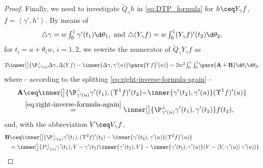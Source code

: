 \begin{proof}
Finally, we need to investigate $ \widetilde{Q}_{\gamma}h $ in \cref{eq:DTP_formula} for $ h\ceq Y_{\gamma}f $, $ f=\left\langle \gamma',h' \right\rangle  $. By means of 
\[\textstyle\triangle\gamma=w\int_{0}^{1}\gamma'(t_1)\d \theta_1, \text{ and }\triangle(Y_\gamma f)=w\int_{0}^{1}(Y_\gamma f)'(t_2)\d \theta_2,\]
for $ t_i=u+\theta_i w,\,i=1,2$, we rewrite the numerator of $ \widetilde{Q}_{\gamma}Y_\gamma f $  as 
\begin{equation}\label{eq:ABsplitting}
\begin{aligned}\textstyle
            2\inner[\big]{ 
                \P^\perp_{\gamma'(u)} \Delta\gamma, \Delta (Y f)
                -
                \inner{ \Delta \gamma,\gamma'(u) } \pars{Y f }'(u) 
            }
            =
            2w^2 \! \int_0^1\int_0^1 
                \!\pars{\mathbf{A} + \mathbf{B}}
            \d \theta_1 \d \theta_2,
\end{aligned}
\end{equation}
where - according to the splitting \cref{eq:right-inverse-formula-again} - 
\begin{equation}\label{eq:splitting-A-part}
\begin{aligned}
    \mathbf{A} 
            &\ceq 
            \inner[\big]{
                 \P^\perp_{\gamma'(u)} \gamma'(t_1)
                 , 
                 (\Upsilon^1f)'(t_2)
                 {-
                 \inner{ \gamma'(t_2),\gamma'(u) } (\Upsilon^1f)'(u)}
            }\\
            &\overset{\cref{eq:right-inverse-formula-again}}{=}\inner[\big]{
                 \P^\perp_{\gamma'(u)} \gamma'(t_1)
                 , 
                 \gamma'(t_2)
            }f(t_2),
\end{aligned}
\end{equation}
and, with the abbreviation $ V\ceq V_{\gamma}f $,
\begin{equation}\label{eq:splitting-B-part}
\begin{aligned}
    \mathbf{B} 
            &\ceq 
            \inner[\big]{
                 \P^\perp_{\gamma'(u)} \gamma'(t_1)
                 , 
                 (\Upsilon^2f)'(t_2)
                 -
                 \inner{ \gamma'(t_2),\gamma'(u) } (\Upsilon^2 f)'(u) 
            }
            \\
             &=
            \inner[\big]{ 
                P^\perp_{\gamma'(u)} \gamma'(t_1)
                ,
                V 
                - \gamma'(t_2) \inner{\gamma'(t_2),V} 
                - \inner{\gamma'(t_2),\gamma'(u)} (V-\left\langle V,\gamma'(u) \right\rangle \gamma'(u))
}
\end{aligned}
\end{equation}
\end{proof}
